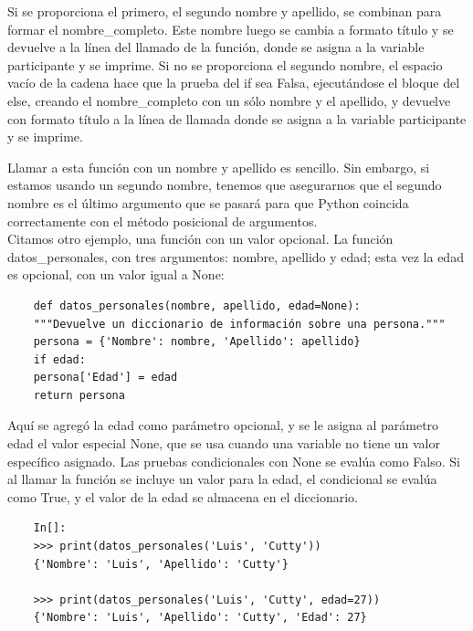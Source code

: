 Si se proporciona el primero, el segundo nombre y apellido, se combinan para formar el {\ttfamily nombre\_completo}. Este nombre luego se cambia a formato título y se devuelve a la línea del  llamado de la función, donde se asigna a la variable participante y se imprime. Si no se proporciona el segundo nombre, el espacio vacío de la cadena hace que la prueba del if sea Falsa,  ejecutándose el  bloque  del {\ttfamily else}, creando el {\ttfamily nombre\_completo} con un sólo nombre y el apellido, y  devuelve con formato título a la línea de llamada donde se asigna a la variable participante y se imprime.

Llamar a esta función con un nombre y apellido es sencillo. Sin embargo, si estamos usando un segundo nombre, tenemos que asegurarnos que el segundo nombre es el último argumento que se pasará para que Python coincida  correctamente con el método posicional de argumentos.\\

Citamos otro ejemplo, una función con un valor opcional. La función {\ttfamily datos\_personales}, con tres argumentos:  nombre, apellido y edad; esta vez la edad es opcional, con un valor igual a {\ttfamily None}: \\

\hspace{-2.5cm}{\ttfamily \scriptsize datos\_}

\vspace{-0.2cm}
\hspace{-2.5cm}{\ttfamily \scriptsize opcional.py}\vspace{-0.84cm}
\begin{lstlisting}
	def datos_personales(nombre, apellido, edad=None):
	"""Devuelve un diccionario de información sobre una persona."""
	persona = {'Nombre': nombre, 'Apellido': apellido}
	if edad:
	persona['Edad'] = edad
	return persona
\end{lstlisting}	

Aquí se agregó la edad como parámetro opcional, y se le asigna al parámetro edad el valor especial  {\ttfamily None}, que se usa cuando una variable no tiene un valor específico asignado. Las pruebas condicionales con  {\ttfamily None} se evalúa como Falso. Si al llamar la función se incluye un valor para la edad, el condicional se evalúa como {\ttfamily True}, y el valor de la edad se almacena en el diccionario. 

\begin{lstlisting}
	In[]:
	>>> print(datos_personales('Luis', 'Cutty'))
	{'Nombre': 'Luis', 'Apellido': 'Cutty'}
	
	>>> print(datos_personales('Luis', 'Cutty', edad=27))
	{'Nombre': 'Luis', 'Apellido': 'Cutty', 'Edad': 27}
\end{lstlisting}

